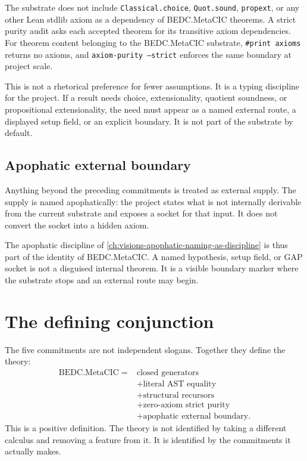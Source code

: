 The substrate does not include \texttt{Classical.choice},
\texttt{Quot.sound}, \texttt{propext}, or any other Lean stdlib axiom as
a dependency of BEDC.MetaCIC theorems. A strict purity audit asks each
accepted theorem for its transitive axiom dependencies. For theorem
content belonging to the BEDC.MetaCIC substrate, \texttt{\#print axioms}
returns no axioms, and \texttt{axiom-purity --strict} enforces the same
boundary at project scale.

This is not a rhetorical preference for fewer assumptions. It is a
typing discipline for the project. If a result needs choice,
extensionality, quotient soundness, or propositional extensionality, the
need must appear as a named external route, a displayed setup field, or
an explicit boundary. It is not part of the substrate by default.

\subsection{Apophatic external boundary}
\label{subsec:bedc-is-its-own-theory-apophatic-boundary}

Anything beyond the preceding commitments is treated as external supply.
The supply is named apophatically: the project states what is not
internally derivable from the current substrate and exposes a socket for
that input. It does not convert the socket into a hidden axiom.

The apophatic discipline of
\autoref{ch:visions-apophatic-naming-as-discipline} is thus part of the
identity of BEDC.MetaCIC. A named hypothesis, setup field, or GAP socket
is not a disguised internal theorem. It is a visible boundary marker
where the substrate stops and an external route may begin.

\section{The defining conjunction}
\label{sec:bedc-is-its-own-theory-defining-conjunction}

The five commitments are not independent slogans. Together they define
the theory:
$$
\begin{aligned}
\mathrm{BEDC.MetaCIC}
  ={}& \text{closed generators}\\
  &+ \text{literal AST equality}\\
  &+ \text{structural recursors}\\
  &+ \text{zero-axiom strict purity}\\
  &+ \text{apophatic external boundary}.
\end{aligned}
$$
This is a positive definition. The theory is not identified by taking a
different calculus and removing a feature from it. It is identified by
the commitments it actually makes.

